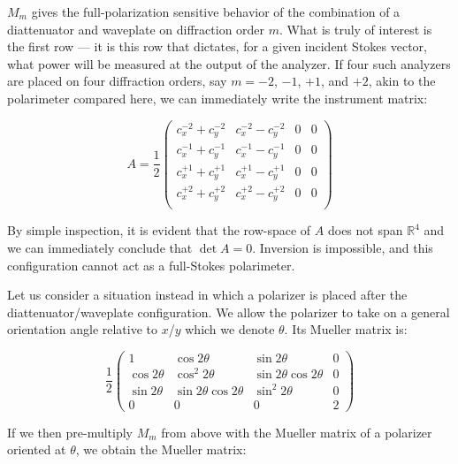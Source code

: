 \documentclass[footinbib,aps,prl,superscriptaddress]{revtex4-1}
\begin{document}
$M_m$ gives the full-polarization sensitive behavior of the combination of a diattenuator and waveplate on diffraction order $m$. What is truly of interest is the first row --- it is this row that dictates, for a given incident Stokes vector, what power will be measured at the output of the analyzer. If four such analyzers are placed on four diffraction orders, say $m=-2$, $-1$, $+1$, and $+2$, akin to the polarimeter compared here, we can immediately write the instrument matrix:

\begin{equation}
	A =
	\frac{1}{2}
	\begin{pmatrix}
	c_x^{-2} + c_y^{-2} & c_x^{-2} - c_y^{-2} & 0 & 0 \\
	c_x^{-1} + c_y^{-1} & c_x^{-1} - c_y^{-1} & 0 & 0 \\
	c_x^{+1} + c_y^{+1} & c_x^{+1} - c_y^{+1} & 0 & 0 \\
	c_x^{+2} + c_y^{+2} & c_x^{+2} - c_y^{+2} & 0 & 0 \\
	\end{pmatrix}
\end{equation}

By simple inspection, it is evident that the row-space of $A$ does not span $\mathbb{R}^4$ and we can immediately conclude that $\det A = 0$. Inversion is impossible, and this configuration cannot act as a full-Stokes polarimeter.

Let us consider a situation instead in which a polarizer is placed after the diattenuator/waveplate configuration. We allow the polarizer to take on a general orientation angle relative to $x$/$y$ which we denote $\theta$. Its Mueller matrix is:

\begin{equation}
	\frac{1}{2}
	\begin{pmatrix}
	1 & \cos2\theta & \sin2\theta & 0 \\
	\cos2\theta & \cos^2 2\theta & \sin2\theta \cos2\theta & 0 \\
	\sin2\theta & \sin2\theta \cos2\theta & \sin^2 2\theta & 0 \\
	0 & 0 & 0 & 2
	\end{pmatrix}
\end{equation}

If we then pre-multiply $M_m$ from above with the Mueller matrix of a polarizer oriented at $\theta$, we obtain the Mueller matrix:
\end{document}
